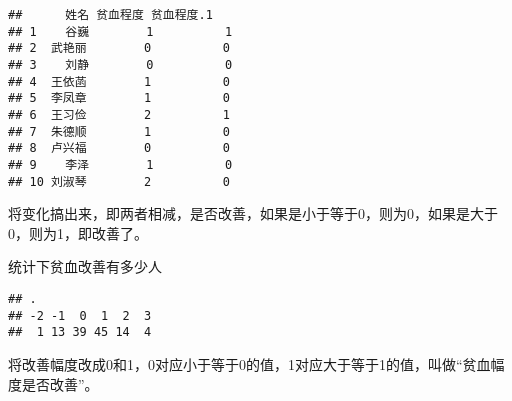 \documentclass[
]{article}
\newenvironment{Shaded}{\begin{snugshade}}{\end{snugshade}}
\newcommand{\CommentTok}[1]{\textcolor[rgb]{0.56,0.35,0.01}{\textit{#1}}}
\newcommand{\DecValTok}[1]{\textcolor[rgb]{0.00,0.00,0.81}{#1}}
\newcommand{\FloatTok}[1]{\textcolor[rgb]{0.00,0.00,0.81}{#1}}
\newcommand{\FunctionTok}[1]{\textcolor[rgb]{0.00,0.00,0.00}{#1}}
\newcommand{\NormalTok}[1]{#1}
\newcommand{\OtherTok}[1]{\textcolor[rgb]{0.56,0.35,0.01}{#1}}
\newcommand{\SpecialCharTok}[1]{\textcolor[rgb]{0.00,0.00,0.00}{#1}}
\begin{document}
\begin{verbatim}
##      姓名 贫血程度 贫血程度.1
## 1    谷巍        1          1
## 2  武艳丽        0          0
## 3    刘静        0          0
## 4  王依菡        1          0
## 5  李凤章        1          0
## 6  王习俭        2          1
## 7  朱德顺        1          0
## 8  卢兴福        0          0
## 9    李泽        1          0
## 10 刘淑琴        2          0
\end{verbatim}

将变化搞出来，即两者相减，是否改善，如果是小于等于0，则为0，如果是大于0，则为1，即改善了。

\begin{Shaded}
\end{Shaded}

统计下贫血改善有多少人

\begin{Shaded}
\end{Shaded}

\begin{verbatim}
## .
## -2 -1  0  1  2  3 
##  1 13 39 45 14  4
\end{verbatim}

将改善幅度改成0和1，0对应小于等于0的值，1对应大于等于1的值，叫做``贫血幅度是否改善''。

\begin{Shaded}
\end{Shaded}
\end{document}
